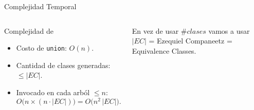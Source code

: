 \begin{frame}{Complejidad Temporal}
	\small
	\begin{columns}[t]
		\begin{block}{Complejidad de \unrEqCl }
			\begin{itemize}[<+- | alert@+>]
				\item Costo de \texttt{union}: $O(n)$.
				\item Cantidad de clases generadas: $\le |EC|$.
				\item Invocado en cada arból $\leq n$:
				\[
				O\bigl(n \times (n\cdot |EC|)\bigr)
				= O\bigl(n^2\,|EC|\bigr).
				\]
			\end{itemize}
		\end{block}
		
				 {
		\begin{mydefinition}
				En vez de usar $\#clases$ vamos a usar $|EC|$ = Ezequiel Companeetz = Equivalence Classes.
			\end{mydefinition}
		}
	\end{columns}
\end{frame}



	

